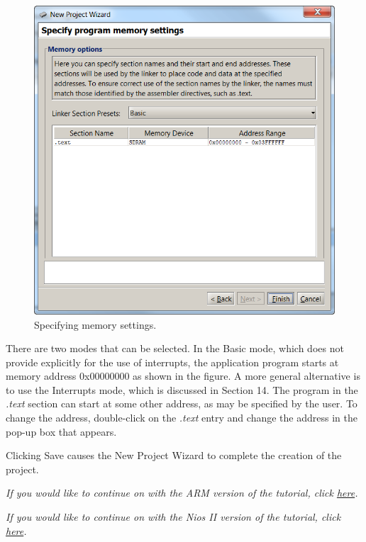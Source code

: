 \documentclass[11pt, twoside, pdftex]{article}
\begin{document}
\begin{figure}[H]
   \begin{center}
      \includegraphics[scale=1]{screenshots/figure12.png}
   \end{center}
   \caption{Specifying memory settings.} 
   \label{fig:NPW_memoryoptions}
\end{figure}

There are two modes that can be selected. In the {\sf Basic}
mode, which does not provide explicitly for the use of
interrupts, the application program starts at memory address
0x00000000 as shown in the figure. A more general alternative
is to use the {\sf Interrupts} mode, which is discussed in
Section 14.  
The program in the {\it .text} section can start 
at some other address, as may be specified by the user.
To change the address, double-click on the {\it .text} entry
and change the address in the pop-up box that appears.

Clicking {\sf Save} causes the New Project Wizard to complete
the creation of the project.

{\it If you would like to continue on with the ARM version of the tutorial, click \hyperref[tut:arm_0]{here}.}

{\it If you would like to continue on with the Nios II version of the tutorial, click \hyperref[tut:nios_1]{here}.}
\end{document}
